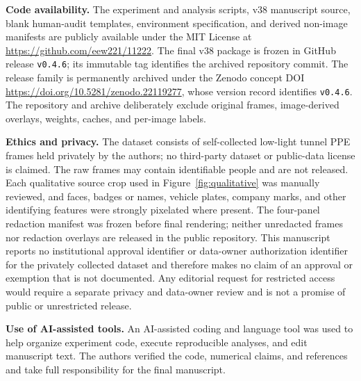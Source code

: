 \documentclass[iicol,pdflatex,sn-mathphys-num]{sn-jnl}
\begin{document}
\textbf{Code availability.} The experiment and analysis scripts, v38 manuscript source, blank human-audit templates, environment specification, and derived non-image manifests are publicly available under the MIT License at \url{https://github.com/eew221/11222}. The final v38 package is frozen in GitHub release \texttt{v0.4.6}; its immutable tag identifies the archived repository commit. The release family is permanently archived under the Zenodo concept DOI \url{https://doi.org/10.5281/zenodo.22119277}, whose version record identifies \texttt{v0.4.6}. The repository and archive deliberately exclude original frames, image-derived overlays, weights, caches, and per-image labels.

\textbf{Ethics and privacy.} The dataset consists of self-collected low-light tunnel PPE frames held privately by the authors; no third-party dataset or public-data license is claimed. The raw frames may contain identifiable people and are not released. Each qualitative source crop used in Figure~\ref{fig:qualitative} was manually reviewed, and faces, badges or names, vehicle plates, company marks, and other identifying features were strongly pixelated where present. The four-panel redaction manifest was frozen before final rendering; neither unredacted frames nor redaction overlays are released in the public repository. This manuscript reports no institutional approval identifier or data-owner authorization identifier for the privately collected dataset and therefore makes no claim of an approval or exemption that is not documented. Any editorial request for restricted access would require a separate privacy and data-owner review and is not a promise of public or unrestricted release.

\textbf{Use of AI-assisted tools.} An AI-assisted coding and language tool was used to help organize experiment code, execute reproducible analyses, and edit manuscript text. The authors verified the code, numerical claims, and references and take full responsibility for the final manuscript.


\end{document}
